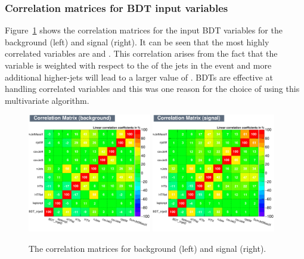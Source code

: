 \subsubsection{Correlation matrices for BDT input variables}


Figure~\ref{fig:corrMat} shows the correlation matrices for the input BDT variables for the background \ttbar (left) and signal \tttt (right). It can be seen that the most highly correlated variables are \njetsw and \redhadmass. This correlation arises from the fact that the \njetsw variable is weighted with respect to the \pt of the jets in the event and more additional higher-\pt jets will lead to a larger value of \redhadmass. BDTs are effective at handling correlated variables and this was one reason for the choice of using this multivariate algorithm.

\begin{figure}[ht!]
    \includegraphics[width=0.48\textwidth]{images/Run2/CorrelationMatrixB.pdf}
    \includegraphics[width=0.48\textwidth]{images/Run2/CorrelationMatrixS.pdf}
    \caption{The correlation matrices for background (left) and signal (right).}
    \label{fig:corrMat}
\end{figure}

